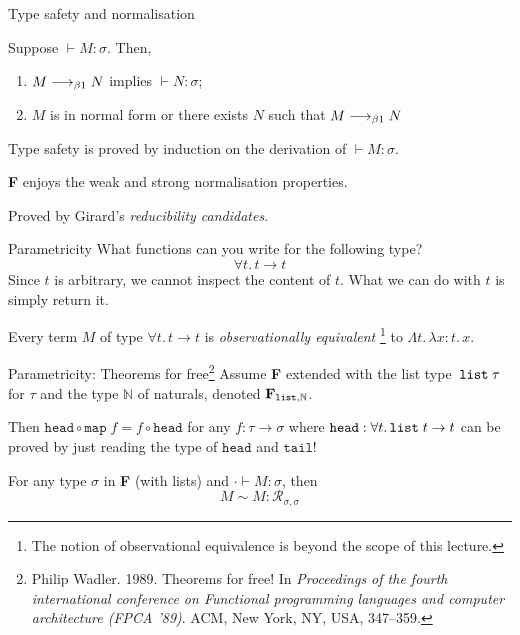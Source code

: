 \begin{frame}{Type safety and normalisation}
  \begin{theorem}
    Suppose $\vdash M : \sigma$. Then, 
    \begin{enumerate}
      \item $M \longrightarrow_{\beta1} N$ implies $\vdash N : \sigma$; 
      \item $M$ is in normal form or there exists $N$ such that $M \longrightarrow_{\beta1} N$
    \end{enumerate}
  \end{theorem}
  Type safety is proved by induction on the derivation of $\vdash M : \sigma$.

  \begin{theorem}
    \textbf{F} enjoys the weak and strong normalisation properties.
  \end{theorem}
  Proved by Girard's \emph{reducibility candidates}.
\end{frame}


\begin{frame}{Parametricity}
  What functions can you write for the following type?
  \[
    \forall t.\,t \to t 
  \]
  Since $t$ is arbitrary, we cannot inspect the content of $t$. What we can do
  with $t$ is simply return it.
  \begin{theorem}
    Every term $M$ of type $\forall t.\, t \to t$ is \emph{observationally equivalent}%
    \footnote{The notion of observational equivalence is beyond the scope of this lecture.}
      to $\Lambda t.\, \lambda x : t.\, x$. 
  \end{theorem}
\end{frame}

\begin{frame}{Parametricity: Theorems for free\footnote{Philip Wadler. 1989. Theorems for free! In \emph{Proceedings of the fourth international conference on Functional programming languages and computer architecture (FPCA ’89)}. ACM, New York, NY, USA, 347–359.}}
  Assume \textbf{F} extended with the list type~$\mathtt{list}\;\tau$ for $\tau$ and
  the type $\mathbb{N}$ of naturals, denoted $\mathbf{F}_{\mathtt{list}, \mathbb{N}}$.

  Then $\mathtt{head} \circ \mathtt{map}\; f = f \circ \mathtt{head}$
      for any $f : \tau \to \sigma$ where $\mathtt{head} : \forall t.\, \mathtt{list}\;t \to t$
  can be proved by just reading the type of $\mathtt{head}$ and $\mathtt{tail}$!
  \begin{theorem}
    For any type $\sigma$ in \textbf{F} (with lists) and $\cdot  \vdash M : \sigma$, then 
    \[
      M \sim M : \mathcal{R}_{\sigma, \sigma}
    \]
  \end{theorem}
\end{frame}


